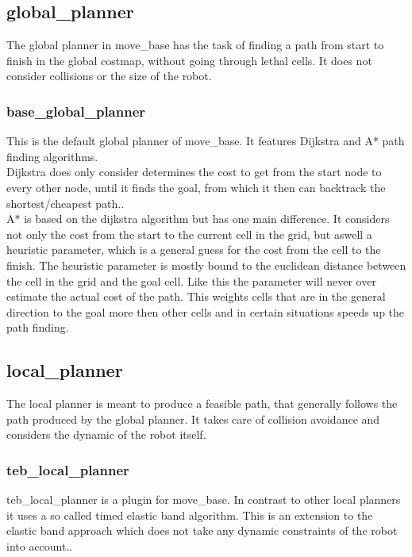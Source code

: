 \subsection{global\_planner}
The global planner in move\_base has the task of finding a path from start to finish in the global costmap, without going through lethal cells. It does not consider collisions or the size of the robot.

\subsubsection{base\_global\_planner}
This is the default global planner of move\_base. It features Dijkstra and A* path finding algorithms.\\

Dijkstra does only consider determines the cost to get from the start node to every other node, until it finds the goal, from which it then can backtrack the shortest/cheapest path.\cite{AlgorithmenundDatenstrukturen}.\\

A* is based on the dijkstra algorithm but has one main difference. It considers not only the cost from the start to the current cell in the grid, but aswell a heuristic parameter, which is a general guess for the cost from the cell to the finish. The heuristic parameter is mostly bound to the euclidean distance between the cell in the grid and the goal cell. Like this the parameter will never over estimate the actual cost of the path\cite{AlgorithmenundDatenstrukturen}. This weights cells that are in the general direction to the goal more then other cells and in certain situations speeds up the path finding.\\

\subsection{local\_planner}
The local planner is meant to produce a feasible path, that generally follows the path produced by the global planner. It takes care of collision avoidance and considers the dynamic of the robot itself.

\subsubsection{teb\_local\_planner}
teb\_local\_planner is a plugin for move\_base. In contrast to other local planners it uses a so called timed elastic band algorithm. This is an extension to the elastic band approach which does not take any dynamic constraints of the robot into account.\cite{Rsmann2012TrajectoryMC}.

